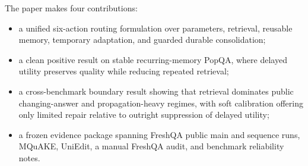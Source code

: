 The paper makes four contributions:
\begin{itemize}[leftmargin=1.5em]
\item a unified six-action routing formulation over parameters, retrieval, reusable memory, temporary adaptation, and guarded durable consolidation;
\item a clean positive result on stable recurring-memory PopQA, where delayed utility preserves quality while reducing repeated retrieval;
\item a cross-benchmark boundary result showing that retrieval dominates public changing-answer and propagation-heavy regimes, with soft calibration offering only limited repair relative to outright suppression of delayed utility;
\item a frozen evidence package spanning FreshQA public main and sequence runs, MQuAKE, UniEdit, a manual FreshQA audit, and benchmark reliability notes.
\end{itemize}
